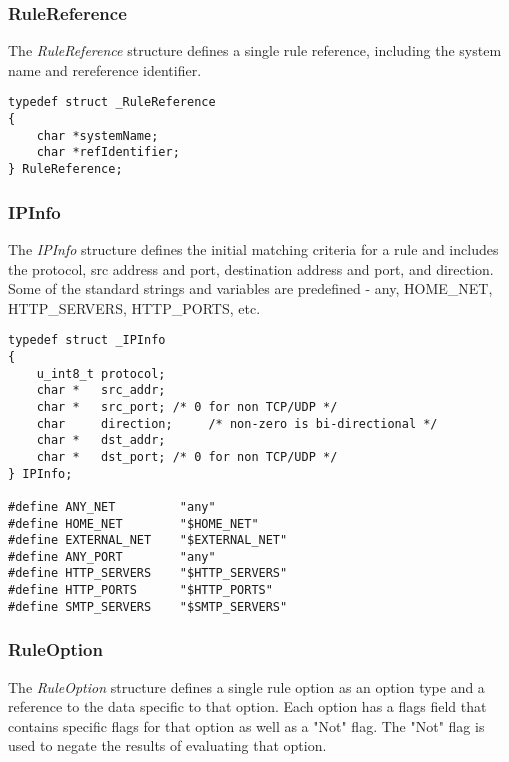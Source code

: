 \documentclass[english]{report}
\begin{document}
\subsubsection{RuleReference}
The {\em RuleReference} structure defines a single rule reference,
including the system name and rereference identifier.

\begin{verbatim}
typedef struct _RuleReference
{
    char *systemName;
    char *refIdentifier;
} RuleReference;
\end{verbatim}

\subsubsection{IPInfo}
The {\em IPInfo} structure defines the initial matching criteria
for a rule and includes the protocol, src address and port,
destination address and port, and direction.  Some of the standard
strings and variables are predefined - any, HOME\_NET, HTTP\_SERVERS,
HTTP\_PORTS, etc.

\begin{verbatim}
typedef struct _IPInfo
{
    u_int8_t protocol;
    char *   src_addr;
    char *   src_port; /* 0 for non TCP/UDP */
    char     direction;     /* non-zero is bi-directional */
    char *   dst_addr;
    char *   dst_port; /* 0 for non TCP/UDP */
} IPInfo;

#define ANY_NET         "any"
#define HOME_NET        "$HOME_NET"
#define EXTERNAL_NET    "$EXTERNAL_NET"
#define ANY_PORT        "any"
#define HTTP_SERVERS    "$HTTP_SERVERS"
#define HTTP_PORTS      "$HTTP_PORTS"
#define SMTP_SERVERS    "$SMTP_SERVERS"
\end{verbatim}

\subsubsection{RuleOption}
The {\em RuleOption} structure defines a single rule option as
an option type and a reference to the data specific to that option.
Each option has a flags field that contains specific flags for
that option as well as a "Not" flag.  The "Not" flag is used
to negate the results of evaluating that option.
\end{document}
